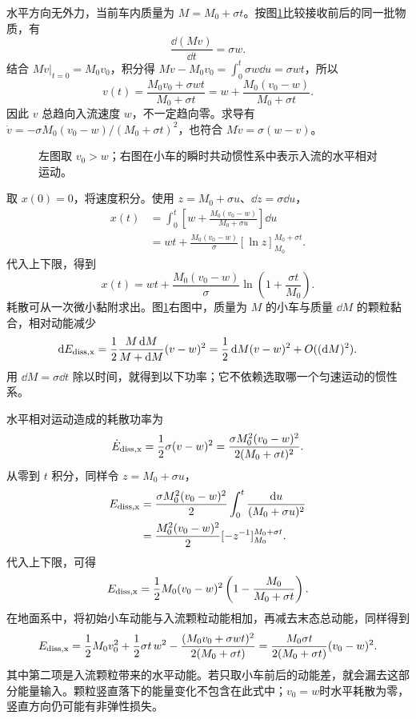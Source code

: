 \begin{solution}
水平方向无外力，当前车内质量为 $M=M_0+\sigma t$。按图\ref{sup3:fig:d3-e8-s}比较接收前后的同一批物质，有
\[
\frac{\dd(Mv)}{\dd t}=\sigma w.
\]
结合 $Mv|_{t=0}=M_0v_0$，积分得 $Mv-M_0v_0=\int_0^t\sigma w\dd u=\sigma wt$，所以
\[
v(t)=\frac{M_0v_0+\sigma wt}{M_0+\sigma t}
=w+\frac{M_0(v_0-w)}{M_0+\sigma t}.
\]
因此 $v$ 总趋向入流速度 $w$，不一定趋向零。求导有
$\dot v=-\sigma M_0(v_0-w)/(M_0+\sigma t)^2$，也符合
$M\dot v=\sigma(w-v)$。
\begin{figure}[H]\centering
{}
\caption{左图取 $v_0>w$；右图在小车的瞬时共动惯性系中表示入流的水平相对运动。}\label{sup3:fig:d3-e8-s}
\end{figure}
取 $x(0)=0$，将速度积分。使用 $z=M_0+\sigma u$、$\dd z=\sigma\dd u$，
\[
\begin{aligned}
x(t)&=\int_0^t\left[w+\frac{M_0(v_0-w)}{M_0+\sigma u}\right]\dd u\\
&=wt+\frac{M_0(v_0-w)}\sigma[\ln z]_{M_0}^{M_0+\sigma t}.
\end{aligned}
\]
代入上下限，得到
\[
x(t)=wt+\frac{M_0(v_0-w)}\sigma
\ln\left(1+\frac{\sigma t}{M_0}\right).
\]
耗散可从一次微小黏附求出。图\ref{sup3:fig:d3-e8-s}右图中，质量为 $M$ 的小车与质量 $\dd M$ 的颗粒黏合，相对动能减少
\[
\mathop{}\!\mathrm d E_{\rm diss,x}=\frac12\frac{M\mathop{}\!\mathrm d M}{M+\mathop{}\!\mathrm d M}(v-w)^2
=\frac12\mathop{}\!\mathrm d M(v-w)^2+O((\mathop{}\!\mathrm d M)^2).
\]
用 $\dd M=\sigma\dd t$ 除以时间，就得到以下功率；它不依赖选取哪一个匀速运动的惯性系。

水平相对运动造成的耗散功率为
\[
\dot E_{\rm diss,x}=\frac12\sigma(v-w)^2
=\frac{\sigma M_0^2(v_0-w)^2}{2(M_0+\sigma t)^2}.
\]
从零到 $t$ 积分，同样令 $z=M_0+\sigma u$，
\[
\begin{aligned}
E_{\rm diss,x}
&=\frac{\sigma M_0^2(v_0-w)^2}{2}\int_0^t\frac{\mathop{}\!\mathrm d u}{(M_0+\sigma u)^2}\\
&=\frac{M_0^2(v_0-w)^2}{2}[-z^{-1}]_{M_0}^{M_0+\sigma t}.
\end{aligned}
\]
代入上下限，可得
\[
E_{\rm diss,x}=\frac12M_0(v_0-w)^2
\left(1-\frac{M_0}{M_0+\sigma t}\right).
\]
在地面系中，将初始小车动能与入流颗粒动能相加，再减去末态总动能，同样得到
\[
E_{\rm diss,x}=\frac12M_0v_0^2+\frac12\sigma t\,w^2
-\frac{(M_0v_0+\sigma wt)^2}{2(M_0+\sigma t)}
=\frac{M_0\sigma t}{2(M_0+\sigma t)}(v_0-w)^2.
\]
其中第二项是入流颗粒带来的水平动能。若只取小车前后的动能差，就会漏去这部分能量输入。颗粒竖直落下的能量变化不包含在此式中；$v_0=w$时水平耗散为零，竖直方向仍可能有非弹性损失。

\end{solution}



